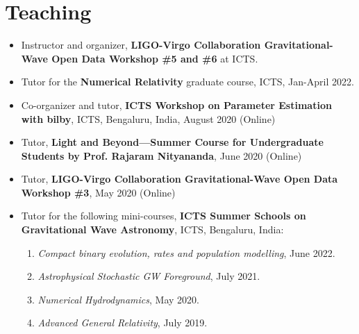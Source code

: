 		\section{Teaching}
		
		\begin{itemize}[leftmargin=*]
		
			\item Instructor and organizer, \textbf{LIGO-Virgo Collaboration Gravitational-Wave Open Data Workshop \#5 and \#6} at ICTS.
			\item Tutor for the \textbf{Numerical Relativity} graduate course, ICTS, Jan-April 2022.
			\item Co-organizer and tutor, \textbf{ICTS Workshop on Parameter Estimation with bilby}, ICTS, Bengaluru, India, August 2020 (Online)
			\item Tutor, \textbf{Light and Beyond---Summer Course for Undergraduate Students by Prof. Rajaram Nityananda}, June 2020 (Online)
			\item Tutor, \textbf{LIGO-Virgo Collaboration Gravitational-Wave Open Data Workshop \#3}, May 2020 (Online)
			\item Tutor for the following mini-courses, \textbf{ICTS Summer Schools on Gravitational Wave Astronomy}, ICTS, Bengaluru, India:
			\begin{enumerate}
				\item \textit{Compact binary evolution, rates and population modelling}, June 2022.
				\item \textit{Astrophysical Stochastic GW Foreground}, July 2021.
				\item \textit{Numerical Hydrodynamics}, May 2020.
				\item \textit{Advanced General Relativity}, July 2019.
			\end{enumerate}
			
		\end{itemize}
		
		


